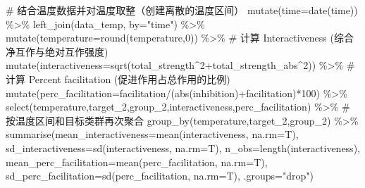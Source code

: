 \documentclass[
  letterpaper,
  DIV=11,
  numbers=noendperiod]{scrreprt}
\newenvironment{Shaded}{\begin{snugshade}}{\end{snugshade}}
\newcommand{\AttributeTok}[1]{\textcolor[rgb]{0.40,0.45,0.13}{#1}}
\newcommand{\CommentTok}[1]{\textcolor[rgb]{0.37,0.37,0.37}{#1}}
\newcommand{\DecValTok}[1]{\textcolor[rgb]{0.68,0.00,0.00}{#1}}
\newcommand{\FunctionTok}[1]{\textcolor[rgb]{0.28,0.35,0.67}{#1}}
\newcommand{\NormalTok}[1]{\textcolor[rgb]{0.00,0.23,0.31}{#1}}
\newcommand{\SpecialCharTok}[1]{\textcolor[rgb]{0.37,0.37,0.37}{#1}}
\newcommand{\StringTok}[1]{\textcolor[rgb]{0.13,0.47,0.30}{#1}}
\begin{document}
\begin{Shaded}
\begin{Highlighting}[]
  \CommentTok{\# 结合温度数据并对温度取整（创建离散的温度区间）}
  \FunctionTok{mutate}\NormalTok{(}\AttributeTok{time=}\FunctionTok{date}\NormalTok{(time)) }\SpecialCharTok{\%\textgreater{}\%}
  \FunctionTok{left\_join}\NormalTok{(data\_temp, }\AttributeTok{by=}\StringTok{"time"}\NormalTok{) }\SpecialCharTok{\%\textgreater{}\%}
  \FunctionTok{mutate}\NormalTok{(}\AttributeTok{temperature=}\FunctionTok{round}\NormalTok{(temperature,}\DecValTok{0}\NormalTok{)) }\SpecialCharTok{\%\textgreater{}\%} 
  \CommentTok{\# 计算 Interactiveness (综合净互作与绝对互作强度)}
  \FunctionTok{mutate}\NormalTok{(}\AttributeTok{interactiveness=}\FunctionTok{sqrt}\NormalTok{(total\_strength}\SpecialCharTok{\^{}}\DecValTok{2}\SpecialCharTok{+}\NormalTok{total\_strength\_abs}\SpecialCharTok{\^{}}\DecValTok{2}\NormalTok{)) }\SpecialCharTok{\%\textgreater{}\%} 
  \CommentTok{\# 计算 Percent facilitation (促进作用占总作用的比例)}
  \FunctionTok{mutate}\NormalTok{(}\AttributeTok{perc\_facilitation=}\NormalTok{facilitation}\SpecialCharTok{/}\NormalTok{(}\FunctionTok{abs}\NormalTok{(inhibition)}\SpecialCharTok{+}\NormalTok{facilitation)}\SpecialCharTok{*}\DecValTok{100}\NormalTok{) }\SpecialCharTok{\%\textgreater{}\%}
  \FunctionTok{select}\NormalTok{(temperature,target\_2,group\_2,interactiveness,perc\_facilitation) }\SpecialCharTok{\%\textgreater{}\%}
  \CommentTok{\# 按温度区间和目标类群再次聚合}
  \FunctionTok{group\_by}\NormalTok{(temperature,target\_2,group\_2) }\SpecialCharTok{\%\textgreater{}\%}
  \FunctionTok{summarise}\NormalTok{(}\AttributeTok{mean\_interactiveness=}\FunctionTok{mean}\NormalTok{(interactiveness, }\AttributeTok{na.rm=}\NormalTok{T),}
            \AttributeTok{sd\_interactiveness=}\FunctionTok{sd}\NormalTok{(interactiveness, }\AttributeTok{na.rm=}\NormalTok{T),}
            \AttributeTok{n\_obs=}\FunctionTok{length}\NormalTok{(interactiveness),}
            \AttributeTok{mean\_perc\_facilitation=}\FunctionTok{mean}\NormalTok{(perc\_facilitation, }\AttributeTok{na.rm=}\NormalTok{T),}
            \AttributeTok{sd\_perc\_facilitation=}\FunctionTok{sd}\NormalTok{(perc\_facilitation, }\AttributeTok{na.rm=}\NormalTok{T), }\AttributeTok{.groups=}\StringTok{"drop"}\NormalTok{)}


\end{Highlighting}
\end{Shaded}
\end{document}
